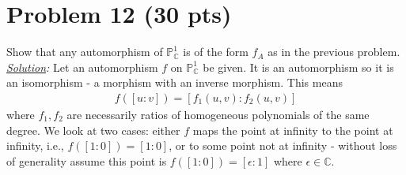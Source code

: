 \documentclass[12pt]{article}
\newcommand{\C}{\mathbb{C}}
\begin{document}
\newpage







\section*{Problem 12 \small{(30 pts)}}
Show that any automorphism of $\mathbb{P}^1_\C$ is of the form $f_A$ as in the previous problem. \\


\noindent \textit{\underline{Solution}:} Let an automorphism $f$ on $\mathbb{P}^1_\C$ be given. It is an automorphism so it is an isomorphism - a morphism with an inverse morphism. This means 
\begin{align*}
f([u:v]) = [f_1(u,v) : f_2(u,v)]
\end{align*}
where $f_1,f_2$ are necessarily ratios of homogeneous polynomials of the same degree. We look at two cases:  either $f$ maps the point at infinity to the point at infinity, i.e., $f([1:0]) = [1:0]$, or to some point not at infinity - without loss of generality assume this point is $f([1:0]) = [\epsilon:1]$ where $\epsilon \in \C$. 
\end{document}
